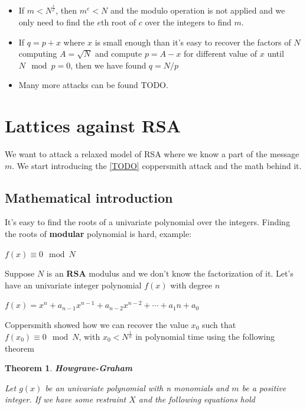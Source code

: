 \documentclass[a4paper,12pt]{report}
\newtheorem{theorem}{Theorem}[section]
\begin{document}
\begin{itemize}
    \item If $m < N^{\frac{1}{e}}$, then $m^e < N$ and the modulo operation is not applied and we only need to find the $e$th root of $c$ over the
        integers to find $m$.
    \item If $q = p + x$ where $x$ is small enough than it's easy to recover the factors of $N$ computing $A = \sqrt{N}$ and compute
            $p = A - x$ for different value of $x$ until $N \mod p = 0$, then we have found $q = N / p$
    \item Many more attacks can be found TODO.
\end{itemize}

\section{Lattices against RSA}

We want to attack a relaxed model of RSA where we know a part of the message $m$.
We start introducing the \ref{TODO} coppersmith attack and the math behind it.

\subsection{Mathematical introduction}

It's easy to find the roots of a univariate polynomial over the integers. Finding the roots of \textbf{modular} polynomial is hard, example:

\begin{center}
    $f(x) \equiv 0 \mod N$
\end{center}

Suppose $N$ is an \textbf{RSA} modulus and we don't know the factorization of it. Let's have an univariate integer polynomial $f(x)$ with degree $n$

\begin{center}
    $f(x) = x^n + a_{n-1}x^{n-1} + a_{n-2}x^{n-2} + \cdots + a_1n + a_0$
\end{center}

Coppersmith showed how we can recover the value $x_0$ such that $f(x_0) \equiv 0 \mod N$, with $x_0 < N^{\frac{1}{n}}$ in polynomial time
using the following theorem

\begin{theorem}
    \textbf{Howgrave-Graham}
\end{theorem}

\textit{Let $g(x)$ be an univariate polynomial with n monomials and $m$ be a positive integer.
    If we have some restraint $X$ and the following equations hold}
\end{document}
